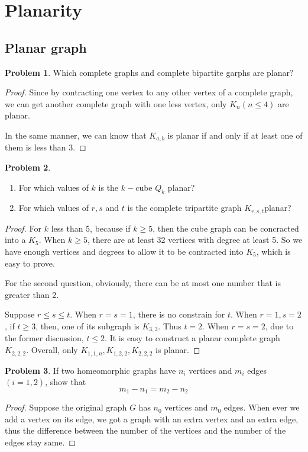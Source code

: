 \documentclass[a4paper,11pt]{article}%
\theoremstyle{remark}
\theoremstyle{definition}
\newtheorem{problem}{Problem}[subsection]
\begin{document}
\section{Planarity}
\subsection{Planar graph}
\begin{problem}
    Which complete graphs and complete bipartite garphs are planar?
    \begin{proof}
        Since by contracting one vertex to any other vertex of a complete graph, we can get 
        another complete graph with one less vertex, only $K_n(n\leq 4)$ are planar.

        In the same manner, we can know that $K_{a,b}$ is planar if and only if at least one of them is less than $3$.
    \end{proof}
\end{problem}
\begin{problem}
    \begin{enumerate}
        \item For which values of $k$ is the $k-$cube $Q_k$ planar?
        \item For which values of $r,s$ and $t$ is the complete tripartite graph $K_{r,s,t}$planar?
    \end{enumerate}
    \begin{proof}
        For $k$ less than 5, because if $k\geq 5$, then the cube graph can be concracted into a $K_5$.
        When $k\geq 5$, there are at least 32 vertices with degree at least 5. So we have enough vertices and 
        degrees to allow it to be contracted into $K_5$, which is easy to prove.

        For the second question, obviously, there can be at most one number that is greater than 2.

        Suppose $r\leq s\leq t$. When $r=s=1$, there is no constrain for $t$. When $r=1,s=2$, if $t\geq 3$, then, 
        one of its subgraph is $K_{3,3}$. Thus $t= 2$. When $r=s=2$, due to the former discussion, $t\leq 2$.
        It is easy to construct a planar complete graph $K_{2,2,2}$.
        Overall, only $K_{1,1,n},K_{1,2,2},K_{2,2,2}$ is planar.
    \end{proof}
\end{problem}
\begin{problem}
   If two homeomorphic graphs have $n_i$ vertices and $m_i$ edges $(i=1,2)$, show that 
   \[m_1-n_1=m_2-n_2\]
   \begin{proof}
    Suppose the original graph $G$ has $n_0$ vertices and $m_0$ edges. 
    When ever we add a vertex on its edge, we got a graph with an extra vertex and an extra edge, thus the 
    difference between the number of the vertices and the number of the edges stay same.
   \end{proof}
\end{problem}
\end{document}
